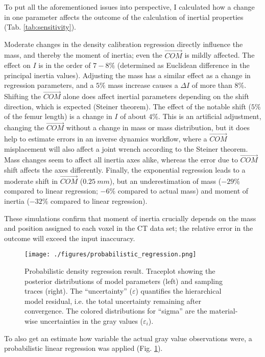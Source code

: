 To put all the aforementioned issues into perspective, I calculated how a change in one parameter affects the outcome of the calculation of inertial properties (Tab. \ref{tab:sensitivity}).

Moderate changes in the density calibration regression directly influence the mass, and thereby the moment of inertia; even the \(\vec{COM}\) is mildly affected.
The effect on \(I\) is in the order of \(7-8 \%\) (determined as Euclidean difference in the principal inertia values).
Adjusting the mass has a similar effect as a change in regression parameters, and a \(5 \%\) mass increase causes a \(\Delta I\) of more than \(8 \%\).
Shifting the \(\vec{COM}\) alone does affect inertial parameters depending on the shift direction, which is expected (Steiner theorem).
The effect of the notable shift (\(5 \%\) of the femur length) is a change in \(I\) of about \(4 \%\).
This is an artificial adjustment, changing the \(\vec{COM}\) without a change in mass or mass distribution, but it does help to estimate errors in an inverse dynamics workflow, where a \(\vec{COM}\) misplacement will also affect a joint wrench according to the Steiner theorem.
Mass changes seem to affect all inertia axes alike, whereas the error due to \(\vec{COM}\) shift affects the axes differently.
Finally, the exponential regression leads to a moderate shift in \(\vec{COM}\) (\(0.25\ mm\)), but an underestimation of mass (\(-29 \%\) compared to linear regression; \(-6 \%\) compared to actual mass) and moment of inertia (\(-32 \%\) compared to linear regression).

These simulations confirm that moment of inertia crucially depends on the mass and position assigned to each voxel in the CT data set; the relative error in the outcome will exceed the input inaccuracy.


\begin{figure}[p]
\centering
\texttt{[image: ./figures/probabilistic\_regression.png]}
\caption{\label{fig:probabilistic_density}Probabilistic density regression result. Traceplot showing the posterior distributions of model parameters (left) and sampling traces (right). The ``uncertainty'' (\(\varepsilon\)) quantifies the hierarchical model residual, i.e. the total uncertainty remaining after convergence. The colored distributions for ``sigma'' are the material-wise uncertainties in the gray values (\(\varepsilon_{i}\)).}
\end{figure}

\bigskip
To also get an estimate how variable the actual gray value observations were, a probabilistic linear regression was applied (Fig. \ref{fig:probabilistic_density}).

